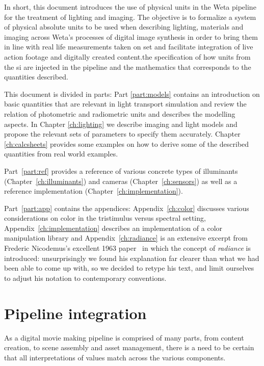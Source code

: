 In short, this document introduces the use of physical units in the
Weta pipeline for the treatment of lighting and imaging.  The
objective is to formalize a system of physical absolute units to be used
when describing lighting, materials and imaging across Weta's
processes of digital image synthesis in order to bring them in line
with real life measurements taken on set and facilitate integration of
live action footage and digitally created content.the specification of
how units from the \gls{si} are injected in the pipeline and the
mathematics that corresponds to the quantities described.


This document is divided in parts: Part \ref{part:models}
contains an introduction on basic quantities that are relevant in
light transport simulation and review the relation of photometric and
radiometric units and describes the modelling aspects. In Chapter
\ref{ch:lighting} we describe imaging and light models and propose the
relevant sets of parameters to specify them accurately.  Chapter
\ref{ch:calcsheets} provides some examples on how to derive some of
the described quantities from real world examples.

Part~\ref{part:ref} provides a reference of various concrete types of
illuminants (Chapter~\ref{ch:illuminants}) and cameras (Chapter~\ref{ch:sensors})
as well as a reference implementation (Chapter~\ref{ch:implementation}).

Part~\ref{part:app} contains the appendices: Appendix~\ref{ch:color} discusses
various considerations on color in the tristimulus versus spectral setting,
Appendix~\ref{ch:implementation} describes an implementation of a color manipulation library
and Appendix~\ref{ch:radiance} is an extensive excerpt from Frederic Nicodemus's 
excellent 1963 paper~\cite{nicodemus63} in which the concept of \textsl{radiance}
is introduced: unsurprisingly we found his explanation far clearer than what we 
had been able to come up with, so we decided to retype his text, and limit ourselves
to adjust his notation to contemporary conventions.

\section{Pipeline integration}

As a digital movie making pipeline is comprised of many parts, from content creation, to
scene assembly and asset management, there is a need to
be certain that all interpretations of values match across the various components.

